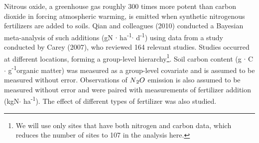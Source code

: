 \documentclass[12pt, oneside]{article}
\begin{document}
Nitrous oxide, a greenhouse gas roughly 300 times more potent than carbon dioxide in forcing atmospheric warming, is emitted when synthetic nitrogenous fertilizers are added to soils. Qian and colleagues (2010) conducted a Bayesian meta-analysis of such additions (gN $\cdot$ ha\textsuperscript{-1}$\cdot$ d\textsuperscript{-1}) using data from a study conducted by Carey (2007), who reviewed 164 relevant studies. Studies occurred at different locations, forming a group-level hierarchy\footnote{We will use only sites that have both nitrogen and carbon data, which reduces the number of sites to 107 in the analysis here.}. Soil carbon content (g $\cdot$ C $\cdot$ g\textsuperscript{-1}organic matter) was measured as a group-level covariate and is assumed to be measured without error. Observations of $N\textsubscript{2}O$ emission is also assumed to be measured without error and were paired with measurements of fertilizer addition (kgN$\cdot$ ha\textsuperscript{-1}). The effect of different types of fertilizer was also studied. 
\end{document}
